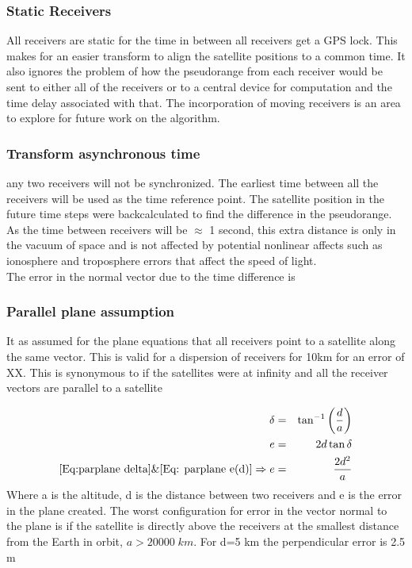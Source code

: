 \documentclass[11pt,a4paper]{article}
\begin{document}
\subsubsection{Static Receivers}
All receivers are static for the time in between all receivers get a GPS lock. This makes for an easier transform to align the satellite positions to a common time. It also ignores the problem of how the pseudorange from each receiver would be sent to either all of the receivers or to a central device for computation and the time delay associated with that. The incorporation of moving receivers is an area to explore for future work on the algorithm.

\subsubsection{Transform asynchronous time}
any two receivers will not be synchronized. The earliest time between all the receivers will be used as the time reference point. The satellite position in the future time steps were backcalculated to find the difference in the pseudorange. As the time between receivers will be $\approx$ 1 second, this extra distance is only in the vacuum of space and is not affected by potential nonlinear affects such as ionosphere and troposphere errors that affect the speed of light.\\

The error in the normal vector due to the time difference is


\subsubsection{Parallel plane assumption}
It as assumed for the plane equations that all receivers point to a satellite along the same vector. This is valid for a dispersion of receivers for 10km for an error of XX. This is synonymous to if the satellites were at infinity and all the receiver vectors are parallel to a satellite



\begin{eqnarray}
\delta &=& \tan^{-1}\left(\frac{d}{a}\right) \label{Eq:parplane delta}\\
e &=& 2d\tan\delta \label{Eq: parplane e(d)}\\
\eqref{Eq:parplane delta} \& \eqref{Eq: parplane e(d)}\Rightarrow e&=&\frac{2d^2}{a}
\end{eqnarray}
Where a is the altitude, d is the distance between two receivers and e is the error in the plane created. The worst configuration for error in the vector normal to the plane is if the satellite is directly above the receivers at the smallest distance from the Earth in orbit, $a>20000\;km$. For d=5 km the perpendicular error is 2.5 m
\end{document}
